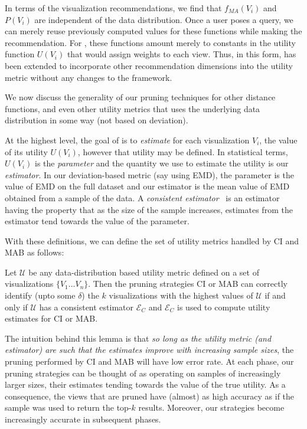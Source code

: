 {In terms of the visualization recommendations, 
we find that $f_{MA}(V_i)$ and $P (V_i)$ are independent
of the data distribution.
Once a user poses a query, we can merely reuse previously 
computed values for these functions while
making the recommendation.
For \SeeDB, these functions amount merely to constants 
in the utility function $U (V_i)$ that would assign weights to each view.
Thus, in this form, \SeeDB has been extended to 
incorporate other recommendation dimensions into
the utility metric without any changes to the \SeeDB framework.
}

We now discuss the generality of our pruning techniques 
for other distance functions, and even other
utility metrics that uses the underlying data distribution in some way (not based on deviation).


At the highest level, the goal of \SeeDB is to {\em estimate} for each visualization $V_i$, 
the value of its utility $U(V_i)$, however that utility may be defined.
In statistical terms, $U(V_i)$ is the {\em parameter} and the quantity we use to estimate the
utility is our {\em estimator}.
In our deviation-based metric (say using EMD), the parameter is the value of EMD on the full
dataset and our estimator is the mean value of EMD obtained from a sample of the data.
A {\em consistent estimator}~\cite{consistent_estimator} is an estimator having the property 
that as the size of the sample increases, estimates from the estimator tend towards the value 
of the parameter. 

With these definitions, we can define the set of utility metrics handled by CI and MAB as follows:
\begin{lemma}
Let $\mathcal{U}$ be any data-distribution based utility metric defined on a set of visualizations $\{
V_1 \ldots V_n\}$. Then the pruning strategies CI or MAB can correctly identify (upto some $\delta$) the 
$k$ visualizations with the highest values of $\mathcal{U}$ if and only if $\mathcal{U}$ has a consistent 
estimator $\mathcal{E}_C$ and $\mathcal{E}_C$ is used to compute utility estimates for CI or MAB.
\end{lemma}

The intuition behind this lemma is that {\em so long as the utility metric (and estimator) are such that
the estimates improve with increasing sample sizes}, the pruning performed by CI and MAB will have low
error rate.
At each phase, our pruning strategies can be thought of as operating on samples of increasingly larger
sizes, their estimates tending towards the value of the true utility.
As a consequence, the views that are pruned have (almost) as high accuracy as if the sample was used to
return the top-$k$ results.
Moreover, our strategies become increasingly accurate in subsequent phases.

